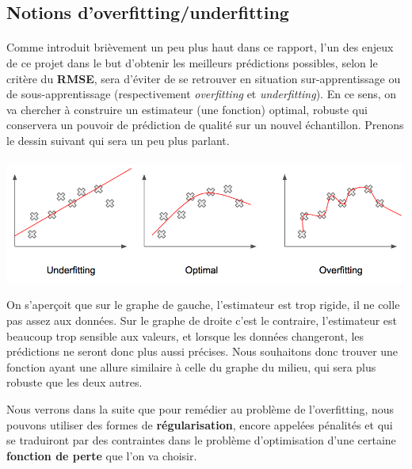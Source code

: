 \documentclass[14pt, openany]{article}
\begin{document}
\subsection{Notions d'overfitting/underfitting}
\paragraph{}
Comme introduit brièvement un peu plus haut dans ce rapport, l'un des enjeux de ce projet dans le but d'obtenir les meilleurs prédictions possibles, selon le critère du \textbf{RMSE}, sera d'éviter de se retrouver en situation sur-apprentissage ou de sous-apprentissage (respectivement \textit{overfitting} et \textit{underfitting}). En ce sens, on va chercher à construire un estimateur (une fonction) optimal, robuste qui conservera un pouvoir de prédiction de qualité sur un nouvel échantillon. Prenons le dessin suivant qui sera un peu plus parlant.
\paragraph{}
\includegraphics[width=17cm]{Images/overfitting.png}
\begin{center}
\label{fig1}
\end{center}
On s'aperçoit que sur le graphe de gauche, l'estimateur est trop rigide, il ne \og colle \fg{} pas assez aux données. Sur le graphe de droite c'est le contraire, l'estimateur est beaucoup trop sensible aux valeurs, et lorsque les données changeront, les prédictions ne seront donc plus aussi précises. Nous souhaitons donc trouver une fonction ayant une allure similaire à celle du graphe du milieu, qui sera plus \og robuste \fg{} que les deux autres.


Nous verrons dans la suite que pour remédier au problème de l'overfitting, nous pouvons utiliser des formes de \textbf{régularisation}, encore appelées pénalités et qui se traduiront par des contraintes dans le problème d'optimisation d'une certaine \textbf{fonction de perte} que l'on va choisir.\\
\end{document}

